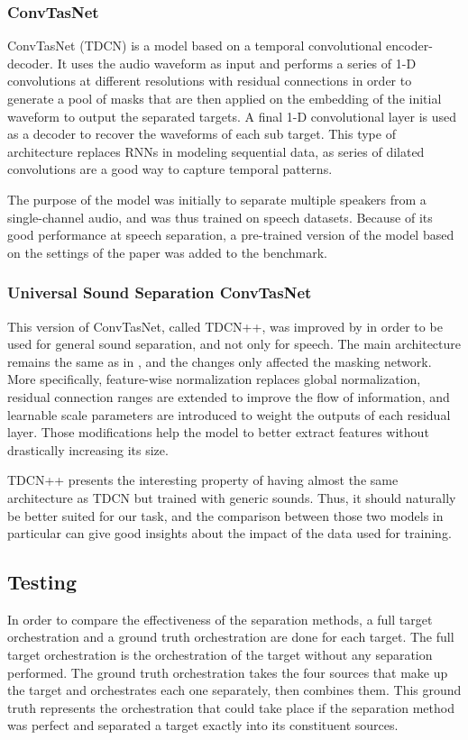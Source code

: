 \documentclass{article}
\begin{document}
			\subsubsection{ConvTasNet}
			ConvTasNet \cite{tdcn} (TDCN) is a model based on a temporal convolutional encoder-decoder. It uses the audio waveform as input and performs a series of 1-D convolutions at different resolutions with residual connections in order to generate a pool of masks that are then applied on the embedding of the initial waveform to output the separated targets. A final 1-D convolutional layer is used as a decoder to recover the waveforms of each sub target. This type of architecture replaces RNNs in modeling sequential data, as series of dilated convolutions are a good way to capture temporal patterns.
			
			The purpose of the model was initially to separate multiple speakers from a single-channel audio, and was thus trained on speech datasets. Because of its good performance at speech separation, a pre-trained version of the model based on the settings of the paper was added to the benchmark.
			
			\subsubsection{Universal Sound Separation ConvTasNet}
			This version of ConvTasNet, called TDCN++, was improved by \cite{tdcnpp} in order to be used for general sound separation, and not only for speech. The main architecture remains the same as in \cite{tdcn}, and the changes only affected the masking network. More specifically, feature-wise normalization replaces global normalization, residual connection ranges are extended to improve the flow of information, and learnable scale parameters are introduced to weight the outputs of each residual layer. Those modifications help the model to better extract features without drastically increasing its size.
			
			TDCN++ presents the interesting property of having almost the same architecture as TDCN but trained with generic sounds. Thus, it should naturally be better suited for our task, and the comparison between those two models in particular can give good insights about the impact of the data used for training.
	
		\subsection{Testing}
		In order to compare the effectiveness of the separation methods, a full target orchestration and a ground truth orchestration are done for each target. The full target orchestration is the orchestration of the target without any separation performed. The ground truth orchestration takes the four sources that make up the target and orchestrates each one separately, then combines them. This ground truth represents the orchestration that could take place if the separation method was perfect and separated a target exactly into its constituent sources. 
		
\end{document}
